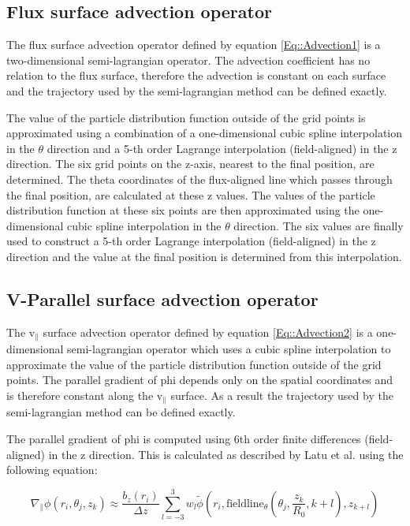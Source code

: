 \subsection{Flux surface advection operator}\label{Flux operator}

The flux surface advection operator defined by equation \ref{Eq::Advection1} is a two-dimensional semi-lagrangian operator. The advection coefficient has no relation to the flux surface, therefore the advection is constant on each surface and the trajectory used by the semi-lagrangian method can be defined exactly.

The value of the particle distribution function outside of the grid points is approximated using a combination of a one-dimensional cubic spline interpolation in the $\theta$ direction and a 5-th order Lagrange interpolation (field-aligned) in the z direction. The six grid points on the z-axis, nearest to the final position, are determined. The theta coordinates of the flux-aligned line which passes through the final position, are calculated at these z values. The values of the particle distribution function at these six points are then approximated using the one-dimensional cubic spline interpolation in the $\theta$ direction. The six values are finally used to construct a 5-th order Lagrange interpolation (field-aligned) in the z direction and the value at the final position is determined from this interpolation.

\subsection{V-Parallel surface advection operator}\label{V-parallel operator}

The v$_\parallel$ surface advection operator defined by equation \ref{Eq::Advection2} is a one-dimensional semi-lagrangian operator which uses a cubic spline interpolation to approximate the value of the particle distribution function outside of the grid points. The parallel gradient of phi depends only on the spatial coordinates and is therefore constant along the v$_\parallel$ surface. As a result the trajectory used by the semi-lagrangian method can be defined exactly.

The parallel gradient of phi is computed using 6th order finite differences (field-aligned) in the z direction. This is calculated as described by Latu et al. \cite{YamanPaper} using the following equation:

\begin{equation}
 \nabla_\parallel \phi(r_i,\theta_j,z_k)\approx \frac{b_z(r_i)}{\Delta z} \underset{l=-3}{\overset{3}{\sum}}w_l\tilde{\phi}\left(r_i,\text{fieldline}_\theta\left(\theta_j,\frac{z_k}{R_0},k+l\right),z_{k+l}\right)
\end{equation}

